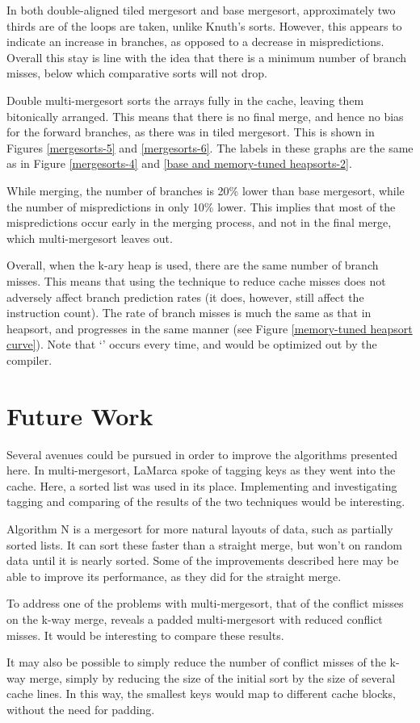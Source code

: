 In both double-aligned tiled mergesort and base mergesort, approximately two
thirds are of the loops are taken, unlike Knuth's sorts. However, this appears
to indicate an increase in branches, as opposed to a decrease in mispredictions.
Overall this stay is line with the idea that there is a minimum number of branch
misses, below which comparative sorts will not drop.

Double multi-mergesort sorts the arrays fully in the cache, leaving them
bitonically arranged. This means that there is no final merge, and hence no bias
for the forward branches, as there was in tiled mergesort. This is shown in
Figures \ref{mergesorts-5} and \ref{mergesorts-6}. The labels in these graphs
are the same as in Figure \ref{mergesorts-4} and \ref{base and memory-tuned
heapsorts-2}.

While merging, the number of branches is 20\% lower than base mergesort, while
the number of mispredictions in only 10\% lower. This implies that most of the
mispredictions occur early in the merging process, and not in the final merge,
which multi-mergesort leaves out.

Overall, when the k-ary heap is used, there are the same number of branch
misses. This means that using the technique to reduce cache misses does not
adversely affect branch prediction rates (it does, however, still affect the
instruction count).  The rate of branch misses is much the same as that in
heapsort, and progresses in the same manner (see Figure \ref{memory-tuned
heapsort curve}). Note that `' occurs every time, and would be
optimized out by the compiler.


\section{Future Work}
Several avenues could be pursued in order to improve the algorithms presented
here. In multi-mergesort, LaMarca spoke of tagging keys as they went into the
cache. Here, a sorted list was used in its place. Implementing and investigating
tagging and comparing of the results of the two techniques would be interesting.

Algorithm N is a mergesort for more natural layouts of data, such as partially
sorted lists. It can sort these faster than a straight merge, but won't on
random data until it is nearly sorted. Some of the improvements described here
may be able to improve its performance, as they did for the straight merge.

To address one of the problems with multi-mergesort, that of the conflict misses
on the k-way merge, \cite{Xiao00} reveals a padded multi-mergesort with reduced 
conflict misses. It would be interesting to compare these results.

It may also be possible to simply reduce the number of conflict misses of the
k-way merge, simply by reducing the size of the initial sort by the size of
several cache lines. In this way, the smallest keys would map to different
cache blocks, without the need for padding.
